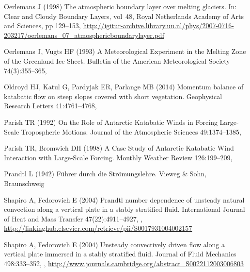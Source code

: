 \begin{thebibliography}{26}
Oerlemans J (1998) {The atmospheric boundary layer over melting glaciers}. In:
  Clear and Cloudy Boundary Layers, vol~48, Royal Netherlands Academy of Arts
  and Sciences, pp 129--153,
  \urlprefix\url{http://igitur-archive.library.uu.nl/phys/2007-0716-203217/oerlemans\_07\_atmosphericboundarylayer.pdf}

Oerlemans J, Vugts HF (1993) {A Meteorological Experiment in the Melting Zone
  of the Greenland Ice Sheet}. Bulletin of the American Meteorological Society
  74(3):355--365, 

Oldroyd HJ, Katul G, Pardyjak ER, Parlange MB (2014) {Momentum balance of
  katabatic flow on steep slopes covered with short vegetation}. Geophysical
  Research Letters 41:4761--4768, 

Parish TR (1992) {On the Role of Antarctic Katabatic Winds in Forcing
  Large-Scale Tropospheric Motions}. Journal of the Atmospheric Sciences
  49:1374--1385, 

Parish TR, Bromwich DH (1998) {A Case Study of Antarctic Katabatic Wind
  Interaction with Large-Scale Forcing}. Monthly Weather Review 126:199--209,

Prandtl L (1942) {F\"{u}hrer durch die Str\"{o}mungslehre}. Vieweg \& Sohn,
  Braunschweig

Shapiro A, Fedorovich E (2004{}) {Prandtl number dependence of
  unsteady natural convection along a vertical plate in a stably stratified
  fluid}. International Journal of Heat and Mass Transfer 47(22):4911--4927,
  ,
  \urlprefix\url{http://linkinghub.elsevier.com/retrieve/pii/S0017931004002157}

Shapiro A, Fedorovich E (2004{}) {Unsteady convectively driven flow
  along a vertical plate immersed in a stably stratified fluid}. Journal of
  Fluid Mechanics 498:333--352, ,
  \urlprefix\url{http://www.journals.cambridge.org/abstract\_S0022112003006803}


\end{thebibliography}
